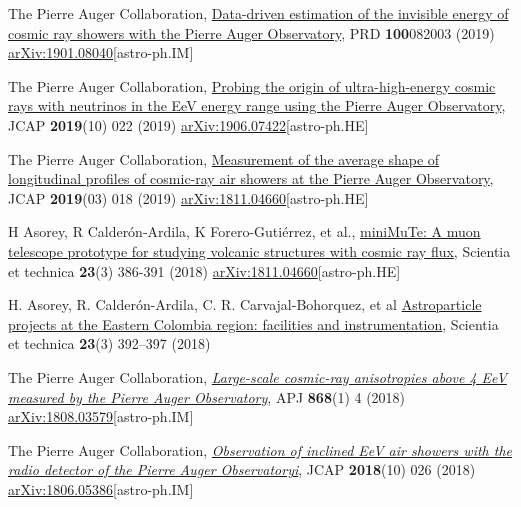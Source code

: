 \begin{etaremune}
\item {}The Pierre Auger Collaboration, \href{https://doi.org/10.1103/PhysRevD.100.082003}{Data-driven estimation of the invisible energy of cosmic ray showers with the Pierre Auger Observatory}, PRD {\bf{100}}082003 (2019) \href{https://arxiv.org/abs/1901.08040}{arXiv:1901.08040}[astro-ph.IM]

\item {}The Pierre Auger Collaboration, \href{https://doi.org/10.1088/1475-7516/2019/10/022}{Probing the origin of ultra-high-energy cosmic rays with neutrinos in the EeV energy range using the Pierre Auger Observatory}, JCAP {\bf{2019}}(10) 022 (2019) \href{https://arxiv.org/abs/1906.07422}{arXiv:1906.07422}[astro-ph.HE]

\item {}The Pierre Auger Collaboration, \href{https://doi.org/10.1088/1475-7516/2019/03/018}{Measurement of the average shape of longitudinal profiles of cosmic-ray air showers at the Pierre Auger Observatory}, JCAP {\bf{2019}}(03) 018 (2019) \href{https://arxiv.org/abs/1811.04660}{arXiv:1811.04660}[astro-ph.HE]

\item {} H Asorey, R Calderón-Ardila, K Forero-Gutiérrez, et al., \href{http://dx.doi.org/10.22517/23447214.17501}{miniMuTe: A muon telescope prototype for studying volcanic structures with cosmic ray flux}, Scientia et technica {\bf{23}}(3) 386-391 (2018) \href{https://arxiv.org/abs/1811.04660}{arXiv:1811.04660}[astro-ph.HE]

\item {}H. Asorey, R. Calderón-Ardila, C. R. Carvajal-Bohorquez, et al \href{http://dx.doi.org/10.22517/23447214.17561}{Astroparticle projects at the Eastern Colombia region: facilities and instrumentation}, Scientia et technica {\bf{23}}(3) 392--397 (2018)



\item {}The Pierre Auger Collaboration, \href{https://doi.org/10.3847/1538-4357/aae689}{\emph{Large-scale cosmic-ray anisotropies above 4 EeV measured by the Pierre Auger Observatory}}, APJ {\bf{868}}(1) 4 (2018) \href{https://arxiv.org/abs/1808.03579}{arXiv:1808.03579}[astro-ph.IM]

\item {}The Pierre Auger Collaboration, \href{https://doi.org/10.1088/1475-7516/2018/10/026}{\emph{Observation of inclined EeV air showers with the radio detector of the Pierre Auger Observatoryi}}, JCAP {\bf{2018}}(10) 026 (2018) \href{https://arxiv.org/abs/1806.05386}{arXiv:1806.05386}[astro-ph.IM]



\end{etaremune}
